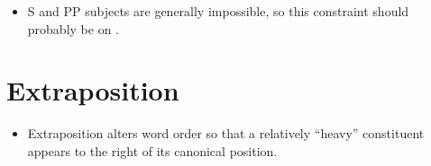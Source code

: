 \documentclass[a4paper,landscape,headrule,footrule]{foils}
\begin{document}
\newpage

\begin{center}\small
\end{center}


\begin{itemize}
\item  S and PP subjects are generally impossible, so this constraint should
   probably be on .
 \end{itemize}
 

\section[Extraposition (\eng{It worries me that X}, \ldots)]{Extraposition}

\begin{itemize}
\item Extraposition alters word order so that a relatively ``heavy''
  constituent appears to the right of its canonical position.
\end{itemize}

\begin{exe}\large
  \ex 
  \begin{xlist}
    \ex  {}
    \ex {}
  \end{xlist}
  \ex 
  \begin{xlist}
    \ex  {}
    \ex {}
  \end{xlist}
  \ex 
  \begin{xlist}
   \ex {}
   \ex  {}
  \end{xlist}
\end{exe}
\end{document}
